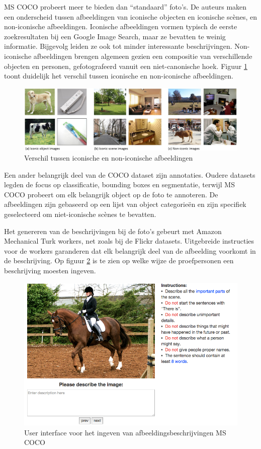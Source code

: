 MS COCO probeert meer te bieden dan ``standaard'' foto's. De auteurs maken een onderscheid tussen afbeeldingen van iconische objecten en iconische sc\`enes, en non-iconische afbeeldingen. Iconische afbeeldingen vormen typisch de eerste zoekresultaten bij een Google Image Search, maar ze bevatten te weinig informatie. Bijgevolg leiden ze ook tot minder interessante beschrijvingen. Non-iconische afbeeldingen brengen algemeen gezien een compositie van verschillende objecten en personen, gefotografeerd vanuit een niet-canonische hoek. Figuur \ref{fig:cocotypes} toont duidelijk het verschil tussen iconische en non-iconische afbeeldingen.

\begin{figure}[tb]
    \centering
    \includegraphics[width=\linewidth]{Images/iconic.jpg}
    \caption{Verschil tussen iconische en non-iconische afbeeldingen}
    \label{fig:cocotypes}
\end{figure}

Een ander belangrijk deel van de COCO dataset zijn annotaties. Oudere datasets legden de focus op classificatie, bounding boxes en segmentatie, terwijl MS COCO probeert om elk belangrijk object op de foto te annoteren. De afbeeldingen zijn gebaseerd op een lijst van object categorie\"en en zijn specifiek geselecteerd om niet-iconische sc\`enes te bevatten.

Het genereren van de beschrijvingen bij de foto's gebeurt met Amazon Mechanical Turk workers, net zoals bij de Flickr datasets. Uitgebreide instructies voor de workers garanderen dat elk belangrijk deel van de afbeelding voorkomt in de beschrijving.  Op figuur \ref{fig:coco_ui} is te zien op welke wijze de proefpersonen een beschrijving moesten ingeven. 


\begin{figure}[tb]
    \centering
    \includegraphics[width=0.8\linewidth]{Images/coco_UI.PNG}
    \caption{User interface voor het ingeven van afbeeldingsbeschrijvingen MS COCO}
    \label{fig:coco_ui}
\end{figure}